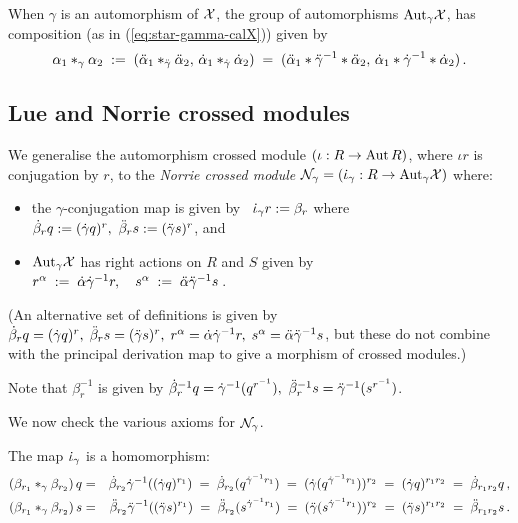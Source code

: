 \bigskip
When $\gamma$ is an automorphism of $\mathcal{X}$, 
the group of automorphisms $\mathrm{Aut}_{\gamma}\mathcal{X}$, 
has composition (as in (\ref{eq:star-gamma-calX})) given by 
$$
\alpha_1 \ast_{\gamma} \alpha_2 
\;:=\; 
(\ddot{\alpha}_1 \ast_{\ddot{\gamma}} \ddot{\alpha}_2,\, \dot{\alpha}_1 \ast_{\dot{\gamma}} \dot{\alpha}_2) 
\;=\; 
(\ddot{\alpha}_1 * \ddot{\gamma}^{-1} * \ddot{\alpha}_2,\, \dot{\alpha}_1 * \dot{\gamma}^{-1} * \dot{\alpha}_2)\,. 
$$

\subsection{Lue and Norrie crossed modules} 
\label{subs:SR-to-autX} 

We generalise the automorphism crossed module 
$(\iota : R \to \mathrm{Aut}\,R)$, where $\iota r$ is conjugation by $r$, 
to the \emph{Norrie crossed module} 
$\mathcal{N}_{\gamma} = (\dot{\iota}_{\gamma} : R \to \mathrm{Aut}_{\gamma}\mathcal{X})$ where: 
\begin{itemize} 
\item 
the $\gamma$-conjugation map is given by~ 
$\dot{\iota}_{\gamma}r := \beta_r$ where 
$\dot{\beta}_r q := (\dot{\gamma} q)^r,~ 
 \ddot{\beta}_r s := (\ddot{\gamma} s)^r$, and 
\item 
$\mathrm{Aut}_{\gamma}\mathcal{X}$ has right actions on $R$ and $S$ given by~ 
$r^{\alpha} \;:=\; \dot{\alpha} \dot{\gamma}^{-1} r, \quad 
 s^{\alpha} \;:=\; \ddot{\alpha} \ddot{\gamma}^{-1} s$\,. 
\end{itemize} 
(An alternative set of definitions is given by 
$\dot{\beta}_r q = (\dot{\gamma} q)^r,\; 
 \ddot{\beta}_r s = (\ddot{\gamma} s)^r,\; 
 r^{\alpha} = \dot{\alpha}\dot{\gamma}^{-1}r,\; 
 s^{\alpha} = \ddot{\alpha}\ddot{\gamma}^{-1}s$, 
but these do not combine with the principal derivation map 
to give a morphism of crossed modules.) 

\noindent 
Note that $\beta_r^{-1}$ is given by 
$\dot{\beta}_r^{-1}q = \dot{\gamma}^{-1}(q^{r^{-1}}),~ \ddot{\beta}_r^{-1}s = \ddot{\gamma}^{-1}(s^{r^{-1}})$. 

\medskip\noindent
We now check the various axioms for $\mathcal{N}_{\gamma}$. 

\noindent 
The map $\dot{\iota}_{\gamma}$ is a homomorphism: 
\begin{eqnarray*} 
\left( \beta_{r_1} \ast_{\gamma} \beta_{r_2} \right)q 
 & = & \dot{\beta}_{r_2} \dot{\gamma}^{-1} ((\dot{\gamma} q)^{r_1}) 
 \;=\; \dot{\beta}_{r_2} (q^{\dot{\gamma}^{-1}r_1}) 
 \;=\; (\dot{\gamma} (q^{\dot{\gamma}^{-1}r_1}))^{r_2} 
 \;=\; (\dot{\gamma} q)^{r_1r_2} 
 \;=\; \dot{\beta}_{r_1r_2} q\,, \\ 
\left( \beta_{r_1} \ast_{\gamma} \beta_{r_2} \right)s 
 & = & \ddot{\beta}_{r_2} \ddot{\gamma}^{-1} ((\ddot{\gamma} s)^{r_1}) 
 \;=\; \ddot{\beta}_{r_2} (s^{\dot{\gamma}^{-1}r_1}) 
 \;=\; (\ddot{\gamma} (s^{\dot{\gamma}^{-1}r_1}))^{r_2} 
 \;=\; (\ddot{\gamma} s)^{r_1r_2}  
 \;=\; \ddot{\beta}_{r_1r_2} s\,. 
\end{eqnarray*}

